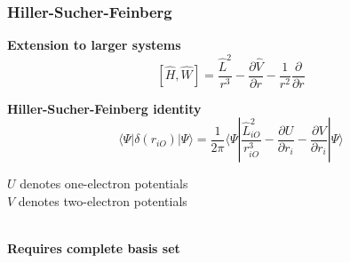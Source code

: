 \begin{frame}
\frametitle{Hiller-Sucher-Feinberg}
\centering
\textbf{Extension to larger systems}
\begin{equation}
    \nonumber
    \left[\hat{H},\hat{W}\right] =
    \frac{\hat{L}^2}{r^3}
    -\frac{\partial \hat{V}}{\partial r}
    -\frac{1}{r^2}\frac{\partial}{\partial r}
\end{equation}

\vspace{10mm}

\pause
\textbf{Hiller-Sucher-Feinberg identity}
\begin{equation}
    \nonumber
    \langle \Psi | \delta(r_{iO}) | \Psi \rangle =
    \frac{1}{2\pi}\langle \Psi |
    \frac{\hat{L}_{iO}^2}{r_{iO}^3} -
    \frac{\partial U}{\partial r_i} - 
    \frac{\partial V}{\partial r_i}
    | \Psi \rangle
\end{equation}

\vspace{2mm}

$U$ denotes one-electron potentials\\
$V$ denotes two-electron potentials\\

\ 
\vspace{2mm}

\textbf{Requires complete basis set}
\end{frame}

